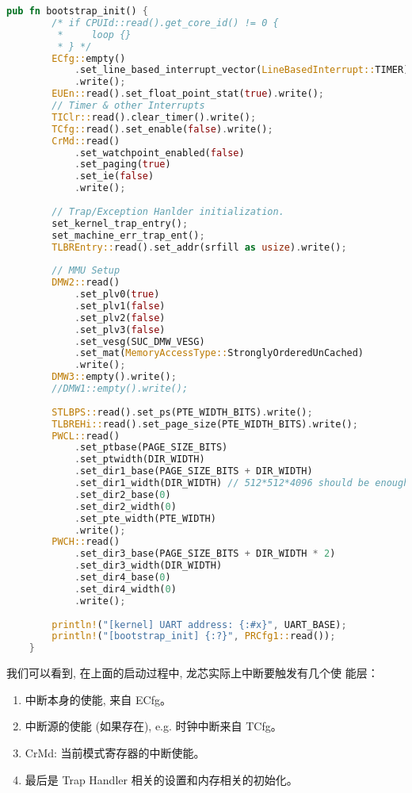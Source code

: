 \begin{lstlisting}[language={rust}, label={code:refill},
	caption={os/src/arch/la64/mod.rs - bootstrap\_init}]
    pub fn bootstrap_init() {
        /* if CPUId::read().get_core_id() != 0 {
         *     loop {}
         * } */
        ECfg::empty()
            .set_line_based_interrupt_vector(LineBasedInterrupt::TIMER)
            .write();
        EUEn::read().set_float_point_stat(true).write();
        // Timer & other Interrupts
        TIClr::read().clear_timer().write();
        TCfg::read().set_enable(false).write();
        CrMd::read()
            .set_watchpoint_enabled(false)
            .set_paging(true)
            .set_ie(false)
            .write();
    
        // Trap/Exception Hanlder initialization.
        set_kernel_trap_entry();
        set_machine_err_trap_ent();
        TLBREntry::read().set_addr(srfill as usize).write();
    
        // MMU Setup
        DMW2::read()
            .set_plv0(true)
            .set_plv1(false)
            .set_plv2(false)
            .set_plv3(false)
            .set_vesg(SUC_DMW_VESG)
            .set_mat(MemoryAccessType::StronglyOrderedUnCached)
            .write();
        DMW3::empty().write();
        //DMW1::empty().write();
    
        STLBPS::read().set_ps(PTE_WIDTH_BITS).write();
        TLBREHi::read().set_page_size(PTE_WIDTH_BITS).write();
        PWCL::read()
            .set_ptbase(PAGE_SIZE_BITS)
            .set_ptwidth(DIR_WIDTH)
            .set_dir1_base(PAGE_SIZE_BITS + DIR_WIDTH)
            .set_dir1_width(DIR_WIDTH) // 512*512*4096 should be enough for 256MiB of 2k1000.
            .set_dir2_base(0)
            .set_dir2_width(0)
            .set_pte_width(PTE_WIDTH)
            .write();
        PWCH::read()
            .set_dir3_base(PAGE_SIZE_BITS + DIR_WIDTH * 2)
            .set_dir3_width(DIR_WIDTH)
            .set_dir4_base(0)
            .set_dir4_width(0)
            .write();
    
        println!("[kernel] UART address: {:#x}", UART_BASE);
        println!("[bootstrap_init] {:?}", PRCfg1::read());
    }    
\end{lstlisting}
我们可以看到, 在上面的启动过程中, 龙芯实际上中断要触发有几个使
能层：
\begin{enumerate}
    \item 中断本身的使能, 来自 ECfg。
    \item 中断源的使能 (如果存在), e.g. 时钟中断来自 TCfg。
    \item CrMd: 当前模式寄存器的中断使能。
    \item 最后是 Trap Handler 相关的设置和内存相关的初始化。
\end{enumerate}
